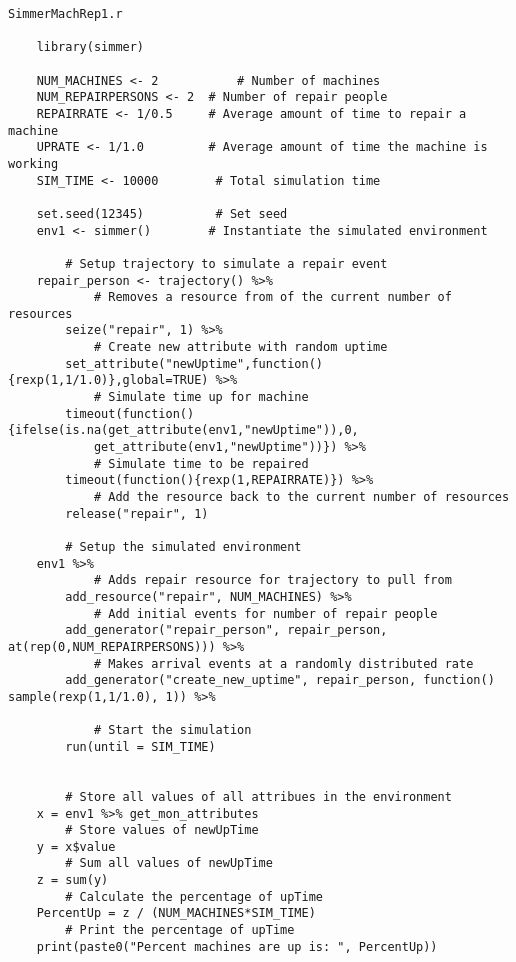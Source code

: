 \documentclass[titlepage]{article}
\begin{document}
\begin{verbatim}
SimmerMachRep1.r

    library(simmer)

    NUM_MACHINES <- 2  		    # Number of machines
    NUM_REPAIRPERSONS <- 2 	# Number of repair people
    REPAIRRATE <- 1/0.5     # Average amount of time to repair a machine
    UPRATE <- 1/1.0        	# Average amount of time the machine is working
    SIM_TIME <- 10000     	 # Total simulation time

    set.seed(12345)			 # Set seed
    env1 <- simmer()		# Instantiate the simulated environment

        # Setup trajectory to simulate a repair event
    repair_person <- trajectory() %>%
            # Removes a resource from of the current number of resources
        seize("repair", 1) %>%
            # Create new attribute with random uptime
        set_attribute("newUptime",function(){rexp(1,1/1.0)},global=TRUE) %>%
            # Simulate time up for machine
        timeout(function() {ifelse(is.na(get_attribute(env1,"newUptime")),0,
            get_attribute(env1,"newUptime"))}) %>%
            # Simulate time to be repaired
        timeout(function(){rexp(1,REPAIRRATE)}) %>%
            # Add the resource back to the current number of resources
        release("repair", 1)

        # Setup the simulated environment
    env1 %>%
            # Adds repair resource for trajectory to pull from
        add_resource("repair", NUM_MACHINES) %>%
            # Add initial events for number of repair people
        add_generator("repair_person", repair_person, at(rep(0,NUM_REPAIRPERSONS))) %>% 
            # Makes arrival events at a randomly distributed rate
        add_generator("create_new_uptime", repair_person, function() sample(rexp(1,1/1.0), 1)) %>%

            # Start the simulation
        run(until = SIM_TIME)


        # Store all values of all attribues in the environment
    x = env1 %>% get_mon_attributes
        # Store values of newUpTime
    y = x$value
        # Sum all values of newUpTime
    z = sum(y)
        # Calculate the percentage of upTime
    PercentUp = z / (NUM_MACHINES*SIM_TIME)
        # Print the percentage of upTime
    print(paste0("Percent machines are up is: ", PercentUp))

\end{verbatim}

\clearpage
\end{document}
